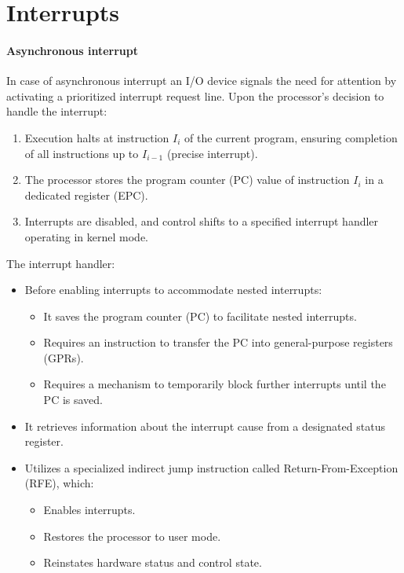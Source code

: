 \section{Interrupts}

\paragraph*{Asynchronous interrupt}
In case of asynchronous interrupt an I/O device signals the need for attention by activating a prioritized interrupt request line.
Upon the processor's decision to handle the interrupt:
\begin{enumerate}
    \item Execution halts at instruction $I_i$ of the current program, ensuring completion of all instructions up to $I_{i-1}$ (precise interrupt).
    \item The processor stores the program counter (PC) value of instruction $I_i$ in a dedicated register (EPC).
    \item Interrupts are disabled, and control shifts to a specified interrupt handler operating in kernel mode.
\end{enumerate}
The interrupt handler: 
\begin{itemize}
    \item Before enabling interrupts to accommodate nested interrupts:
        \begin{itemize}
            \item It saves the program counter (PC) to facilitate nested interrupts.
            \item Requires an instruction to transfer the PC into general-purpose registers (GPRs).
            \item Requires a mechanism to temporarily block further interrupts until the PC is saved.
        \end{itemize}
    \item It retrieves information about the interrupt cause from a designated status register.
    \item Utilizes a specialized indirect jump instruction called Return-From-Exception (RFE), which:
        \begin{itemize}
            \item Enables interrupts.
            \item Restores the processor to user mode.
            \item Reinstates hardware status and control state.
        \end{itemize}
\end{itemize}


